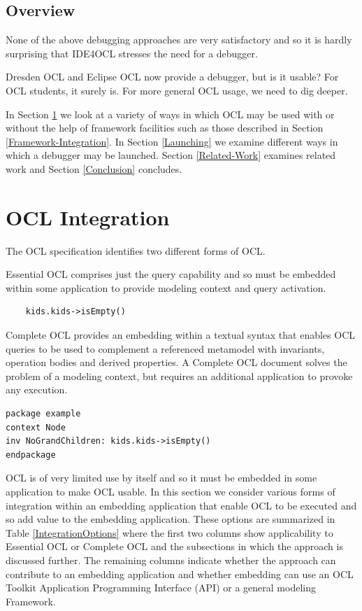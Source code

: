 \documentclass[a4paper]{article}
\begin{document}
\subsection{Overview}

None of the above debugging approaches are very satisfactory and so it is hardly surprising that IDE4OCL\cite{Chimiak-Opaka} stresses the need for a debugger.

Dresden OCL\cite{DresdenOCL-Debug} and Eclipse OCL\cite{OCL-Luna} now provide a debugger, but is it usable? For OCL students, it surely is. For more general OCL usage, we need to dig deeper.

In Section  \ref{OCL-Integration} we look at a variety of ways in which OCL may be used with or without the help of framework facilities such as those described in Section \ref{Framework-Integration}. In Section \ref{Launching} we examine different ways in which a debugger may be launched.  Section \ref{Related-Work} examines related work and Section \ref{Conclusion} concludes.

\section{OCL Integration}\label{OCL-Integration}

The OCL specification identifies two different forms of OCL.

Essential OCL comprises just the query capability and so must be embedded within some application to provide modeling context and query activation.

\begin{verbatim}
    kids.kids->isEmpty()
\end{verbatim}

Complete OCL provides an embedding within a textual syntax that enables OCL queries to be used to complement a referenced metamodel with invariants, operation bodies and derived properties. A Complete OCL document solves the problem of a modeling context, but requires an additional application to provoke any execution.

\begin{verbatim}
package example
context Node
inv NoGrandChildren: kids.kids->isEmpty()
endpackage
\end{verbatim}

OCL is of very limited use by itself and so it must be embedded in some application to make OCL usable. In this section we consider various forms of integration within an embedding application that enable OCL to be executed and so add value to the embedding application. These options are summarized in Table \ref{IntegrationOptions} where the first two columns show applicability to Essential OCL or Complete OCL and the subsections in which the approach is discussed further. The remaining columns indicate whether the approach can contribute to an embedding application and whether embedding can use an OCL Toolkit Application Programming Interface (API) or a general modeling Framework.
\end{document}
